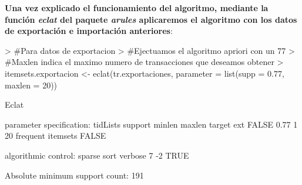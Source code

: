 \documentclass [a4paper] {article}
\begin{document}
\textbf{Una vez explicado el funcionamiento del algoritmo, mediante la función \textit{eclat} del paquete \textit{arules} aplicaremos el algoritmo con los datos de exportación e importación anteriores}:

{\scriptsize
\begin{Schunk}
\begin{Sinput}
> #Para datos de exportacion
> #Ejectuamos el algoritmo apriori con un 77% de soporte y un 90% de confianza
> #Maxlen indica el maximo numero de transacciones que deseamos obtener
> itemsets.exportacion <- eclat(tr.exportaciones, parameter = list(supp = 0.77, maxlen = 20))
\end{Sinput}
\begin{Soutput}
Eclat

parameter specification:
 tidLists support minlen maxlen            target   ext
    FALSE    0.77      1     20 frequent itemsets FALSE

algorithmic control:
 sparse sort verbose
      7   -2    TRUE

Absolute minimum support count: 191 


\end{Soutput}
\end{Schunk}}
\end{document}
